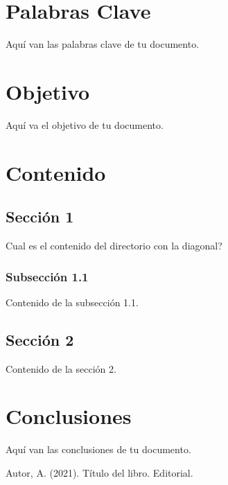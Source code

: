 \documentclass[12pt]{report}
\begin{document}
\chapter*{Palabras Clave}
Aquí van las palabras clave de tu documento.
\newpage

\chapter*{Objetivo}
Aquí va el objetivo de tu documento.
\newpage

\chapter{Contenido}
\section{Sección 1}
Cual es el contenido del directorio con la diagonal?

 \cite{1}

\subsection{Subsección 1.1}
Contenido de la subsección 1.1.

\section{Sección 2}
Contenido de la sección 2.
\newpage

\chapter{Conclusiones}
Aquí van las conclusiones de tu documento.
\newpage

\begin{thebibliography}{1}
 Autor, A. (2021). Título del libro. Editorial.
\end{thebibliography}
\end{document}

